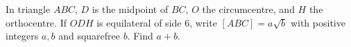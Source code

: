 In triangle $ABC$, $D$ is the midpoint of $BC$, $O$ the circumcentre, and $H$ the orthocentre. If $ODH$ is equilateral of side $6$, write $[ABC]=a\sqrt b$ with positive integers $a,b$ and squarefree $b$. Find $a+b$.
